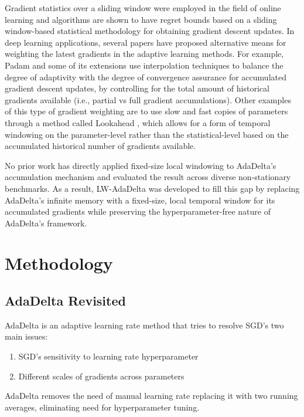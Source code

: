\documentclass[11pt,a4paper]{article}
\begin{document}
Gradient statistics over a sliding window were employed in the field of online learning and algorithms are shown to have regret bounds based on a sliding window-based statistical methodology for obtaining gradient descent updates. In deep learning applications, several papers have proposed alternative means for weighting the latest gradients in the adaptive learning methods. For example, Padam \citep{chen2018padam} and some of its extensions use interpolation techniques to balance the degree of adaptivity with the degree of convergence assurance for accumulated gradient descent updates, by controlling for the total amount of historical gradients available (i.e., partial vs full gradient accumulations). Other examples of this type of gradient weighting are to use slow and fast copies of parameters through a method called Lookahead \citep{zhang2019lookahead}, which allows for a form of temporal windowing on the parameter-level rather than the statistical-level based on the accumulated historical number of gradients available.

No prior work has directly applied fixed-size local windowing to AdaDelta's accumulation mechanism and evaluated the result across diverse non-stationary benchmarks. As a result, LW-AdaDelta was developed to fill this gap by replacing AdaDelta's infinite memory with a fixed-size, local temporal window for its accumulated gradients while preserving the hyperparameter-free nature of AdaDelta's framework.

\section{Methodology}
\label{sec:methodology}

\subsection{AdaDelta Revisited}

AdaDelta is an adaptive learning rate method that tries to resolve SGD's two main issues:
\begin{enumerate}
    \item SGD's sensitivity to learning rate hyperparameter
    \item Different scales of gradients across parameters
\end{enumerate}

AdaDelta removes the need of manual learning rate replacing it with two running averages, eliminating need for hyperparameter tuning.
\end{document}
